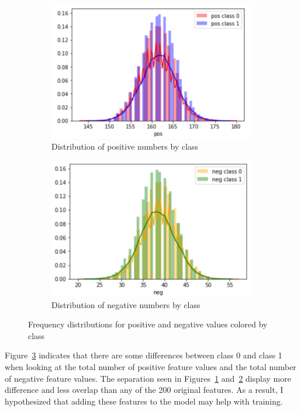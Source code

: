 \documentclass[11pt,letterpaper]{article}
\begin{document}
\begin{figure}[h!]
    \centering
    \begin{subfigure}[]{.4\textwidth}
        \includegraphics[width=\textwidth]{pos_dist.png}
        \caption{Distribution of positive numbers by class}
        \label{fig:pos_dist}
    \end{subfigure}
    \begin{subfigure}[]{.4\textwidth}
        \includegraphics[width=\textwidth]{neg_dist.png}
        \caption{Distribution of negative numbers by class}
        \label{fig:neg_dist}
    \end{subfigure}
    \caption{Frequency distributions for positive and negative values colored by
class}
    \label{fig:count_dist}
\end{figure}

Figure~\ref{fig:count_dist} indicates that there are some differences
between class 0 and class 1 when looking at the total number of positive feature
values and the total number of negative feature values. The separation seen in
Figures~\ref{fig:pos_dist} and~\ref{fig:neg_dist} display more difference and
less overlap than any of the 200 original features.  As a result, I
hypothesized that adding these features to the model may help with training. 
\end{document}

